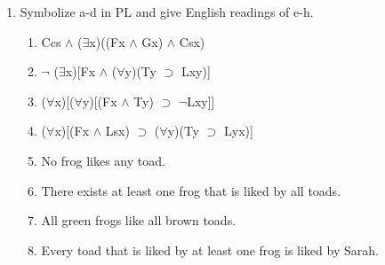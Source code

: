 \documentclass[12pt,letterpaper]{article}
\begin{document}
\begin{enumerate}
    \item
      Symbolize a-d in PL and give English readings of e-h.
      \begin{enumerate}
        \item Ccs $\land$ ($\exists$x)((Fx $\land$ Gx) $\land$ Csx)
        \item $\neg$ ($\exists$x)[Fx $\land$ ($\forall$y)(Ty $\supset$ Lxy)]
        \item ($\forall$x)[($\forall$y)[(Fx $\land$ Ty) $\supset$ $\neg$Lxy]]
        \item ($\forall$x)[(Fx $\land$ Lsx) $\supset$ ($\forall$y)(Ty $\supset$ Lyx)]

        \item No frog likes any toad.
        \item There exists at least one frog that is liked by all toads.
        \item All green frogs like all brown toads.
        \item Every toad that is liked by at least one frog is liked by Sarah.
      \end{enumerate}
  \end{enumerate}
\end{document}

